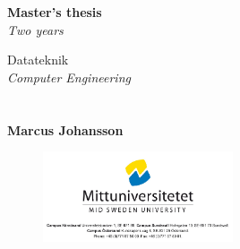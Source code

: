 
    \begin{titlepage}
    \selectfont
    \begin{tcolorbox}
    \vspace{58ex}
    {\normalfont\sffamily
        \hspace*{6ex} \large{\textbf{Master's thesis}}\\
        \hspace*{3.2ex} \textit{\large{Two years}}\\
        \vspace{4ex}
        
        \hspace*{3.3ex} \normalsize{Datateknik}\\
        \hspace*{6ex} \textit{Computer Engineering}\\
        \hspace*{6ex} \textbf{\reptitle}\\
        \hspace*{6ex} \repsubtitle \\
        \hspace*{6ex} \textbf{Marcus Johansson}\\
    }
    \end{tcolorbox}
    \begin{figure}[h]
        \centering
        \includegraphics[width=0.5\textwidth]{illustrations/miunlogo.png}
        \label{fig:my_label}
    \end{figure}
    \end{titlepage}


